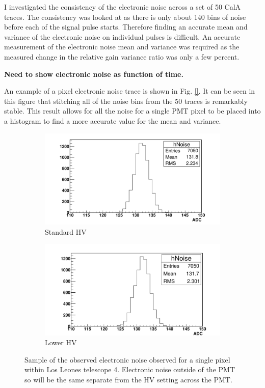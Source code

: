 I investigated the consistency of the electronic noise across a set of 50 CalA traces. The consistency was looked at as there is only about 140 bins of noise before each of the signal pulse starts. Therefore finding an accurate mean and variance of the electronic noise on individual pulses is difficult. An accurate measurement of the electronic noise mean and variance was required as the measured change in the relative gain variance ratio was only a few percent.

\textbf{Need to show electronic noise as function of time.}

An example of a pixel electronic noise trace is shown in Fig. \ref{}. It can be seen in this figure that stitching all of the noise bins from the 50 traces is remarkably stable. This result allows for all the noise for a single PMT pixel to be placed into a histogram to find a more accurate value for the mean and variance.

\begin{figure} %
\centering
\begin{subfigure}[b]{0.95\textwidth}
\includegraphics[width=\textwidth]{chapters/graphs/GainVarsMeas/LL_m04_2016-06-11/example_NoiseHist1.pdf}
\caption{Standard HV}
\end{subfigure}
\vspace{3mm}
\begin{subfigure}[b]{0.95\textwidth}
\includegraphics[width=\textwidth]{chapters/graphs/GainVarsMeas/LL_m04_2016-06-11/example_NoiseHist2.pdf}
\caption{Lower HV}
\end{subfigure}
\caption{Sample of the observed electronic noise observed for a single pixel within Los Leones telescope 4. Electronic noise outside of the PMT so will be the same separate from the HV setting across the PMT.}
\end{figure}

